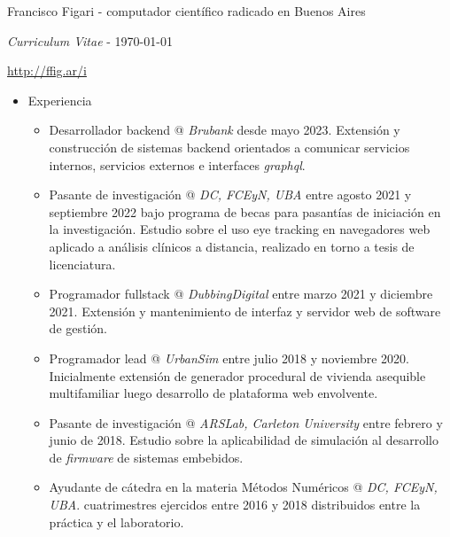 \documentclass[a4paper]{article}
\begin{document}
\thispagestyle{empty}  %

Francisco Figari - computador científico radicado en Buenos Aires

\textit{Curriculum Vitae} - \monthyeardate\today

\url{http://ffig.ar/i}

\begin{itemize}

  \item Experiencia
  \begin{itemize}
    \item
      Desarrollador backend @ \textit{Brubank} desde mayo 2023. \newline
      Extensión y construcción de sistemas backend orientados a comunicar
      servicios internos, servicios externos e interfaces \textit{graphql}.

    \item
      Pasante de investigación @ \textit{DC, FCEyN, UBA} entre agosto 2021 y
      septiembre 2022 bajo programa de becas para pasantías de iniciación en
      la investigación. \newline
      Estudio sobre el uso eye tracking en navegadores web aplicado a análisis
      clínicos a distancia, realizado en torno a tesis de licenciatura.

    \item
      Programador fullstack @ \textit{DubbingDigital} entre marzo 2021 y
      diciembre 2021.  \newline
      Extensión y mantenimiento de interfaz y servidor web de software de
      gestión.

    \item
      Programador lead @ \textit{UrbanSim} entre julio 2018 y noviembre 2020.
      \newline
      Inicialmente extensión de generador procedural de vivienda asequible
      multifamiliar luego desarrollo de plataforma web envolvente.

    \item
      Pasante de investigación @ \textit{ARSLab, Carleton University} entre
      febrero y junio de 2018. \newline
      Estudio sobre la aplicabilidad de simulación al desarrollo de
      \textit{firmware} de sistemas embebidos.

    \item
      Ayudante de cátedra en la materia Métodos Numéricos @ \textit{DC, FCEyN,
      UBA}.   cuatrimestres ejercidos entre 2016 y 2018 distribuidos entre la
      práctica y el laboratorio.


\end{itemize}
\end{itemize}
\end{document}
